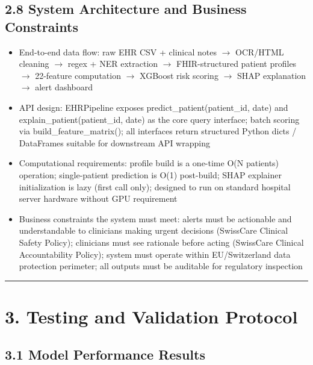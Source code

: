 \documentclass[11pt,a4paper]{article}
\begin{document}
\subsection{2.8 System Architecture and Business Constraints}
\begin{itemize}
\item End-to-end data flow: raw EHR CSV + clinical notes $\rightarrow$ OCR/HTML cleaning $\rightarrow$ regex + NER extraction $\rightarrow$ FHIR-structured patient profiles $\rightarrow$ 22-feature computation $\rightarrow$ XGBoost risk scoring $\rightarrow$ SHAP explanation $\rightarrow$ alert dashboard
\item API design: EHRPipeline exposes predict\_patient(patient\_id, date) and explain\_patient(patient\_id, date) as the core query interface; batch scoring via build\_feature\_matrix(); all interfaces return structured Python dicts / DataFrames suitable for downstream API wrapping
\item Computational requirements: profile build is a one-time O(N patients) operation; single-patient prediction is O(1) post-build; SHAP explainer initialization is lazy (first call only); designed to run on standard hospital server hardware without GPU requirement
\item Business constraints the system must meet: alerts must be actionable and understandable to clinicians making urgent decisions (SwissCare Clinical Safety Policy); clinicians must see rationale before acting (SwissCare Clinical Accountability Policy); system must operate within EU/Switzerland data protection perimeter; all outputs must be auditable for regulatory inspection
\end{itemize}

\noindent\rule{\linewidth}{0.4pt}

\section{3. Testing and Validation Protocol}

\subsection{3.1 Model Performance Results}
\end{document}
